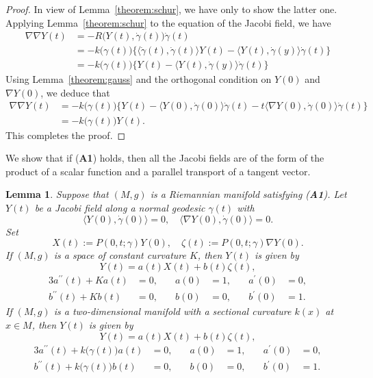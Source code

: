 \documentclass[a4paper,11pt,reqno]{amsart}
\numberwithin{equation}{section}
\newtheorem{lemma}[theorem]{Lemma}
\theoremstyle{definition}
\theoremstyle{remark}
\begin{document}
%
%
\begin{proof}
In view of Lemma~\ref{theorem:schur}, we have only to show the latter one. 
Applying Lemma~\ref{theorem:schur} to the equation of the Jacobi field, we have 
%
%
\begin{align*}
  \nabla\nabla{Y(t)}
& =
  -R\bigl(Y(t),\dot{\gamma}(t)\bigr)\dot{\gamma}(t)
\\
& =
  -
  k\bigl(\gamma(t)\bigr)
  \{
  \langle{\dot{\gamma}(t),\dot{\gamma}(t)}\rangle{Y(t)}
  -
  \langle{Y(t),\dot{\gamma}(y)}\rangle\dot{\gamma}(t)
  \} 
\\
& =
  - 
  k\bigl(\gamma(t)\bigr)
  \{
  Y(t)
  -
  \langle{Y(t),\dot{\gamma}(y)}\rangle\dot{\gamma}(t)
  \} 
\end{align*}
%
%
Using Lemma~\ref{theorem:gauss} 
and the orthogonal condition on $Y(0)$ and $\nabla{Y(0)}$, 
we deduce that 
%
%
\begin{align*}
  \nabla\nabla{Y(t)}
& =
  -
  k\bigl(\gamma(t)\bigr)
  \{
  Y(t)
  -
  \langle{Y(0),\dot{\gamma}(0)}\rangle\dot{\gamma}(t)
  -
  t\langle{{\nabla}Y(0),\dot{\gamma}(0)}\rangle\dot{\gamma}(t)
  \}
\\
& =
  -
  k\bigl(\gamma(t)\bigr)Y(t).  
\end{align*}
%
%
This completes the proof.
\end{proof}
%
%
We show that if ({\bf A1}) holds, then all the Jacobi fields are 
of the form of the product of a scalar function and a parallel transport of 
a tangent vector. 
%
%
\begin{lemma}
\label{theorem:jacobi2} 
Suppose that $(M,g)$ is a Riemannian manifold satisfying {\rm ({\bf A1})}. 
Let $Y(t)$ be a Jacobi field along a normal geodesic $\gamma(t)$ with 
%
%
$$
\langle{Y(0),\dot{\gamma}(0)}\rangle=0,
\quad
\langle{{\nabla}Y(0),\dot{\gamma}(0)}\rangle=0. 
$$
%
%
Set 
%
%
$$
X(t):=P(0,t;\gamma)Y(0),
\quad
\zeta(t):=P(0,t;\gamma)\nabla{Y}(0). 
$$
%
%
If $(M,g)$ is a space of constant curvature $K$,  
then $Y(t)$ is given by 
%
%
$$
Y(t)=a(t)X(t)+b(t)\zeta(t),
$$
%
%
\begin{alignat*}{3}
  a^{\prime\prime}(t)+Ka(t)
& =
  0,
& \quad 
  a(0)
& =
  1,
& \quad
  a^\prime(0)
& =
  0,
\\
  b^{\prime\prime}(t)+Kb(t)
& =
  0,
& \quad 
  b(0)
& =
  0,
& \quad
  b^\prime(0)
& =
  1. 
\end{alignat*}
%
%
If $(M,g)$ is a two-dimensional manifold 
with a sectional curvature $k(x)$ at $x \in M$, 
then $Y(t)$ is given by 
%
%
$$
Y(t)=a(t)X(t)+b(t)\zeta(t),
$$
%
%
\begin{alignat*}{3}
  a^{\prime\prime}(t)+k\bigl(\gamma(t)\bigr)a(t)
& =
  0,
& \quad 
  a(0)
& =
  1,
& \quad
  a^\prime(0)
& =
  0,
\\
  b^{\prime\prime}(t)+k\bigl(\gamma(t)\bigr)b(t)
& =
  0,
& \quad 
  b(0)
& =
  0,
& \quad
  b^\prime(0)
& =
  1. 
\end{alignat*}
%
%
\end{lemma}
\end{document}
